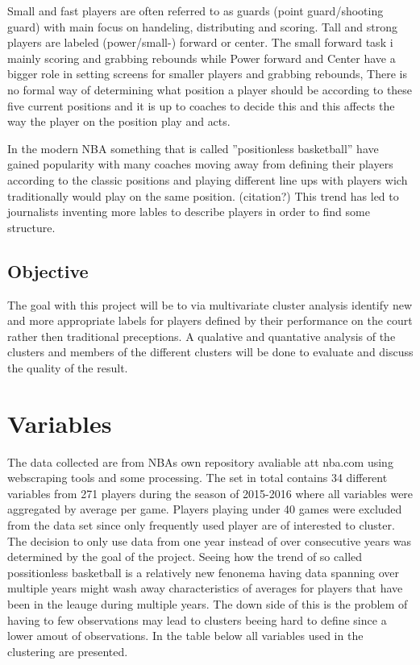 \documentclass{article}
\begin{document}
Small and fast players are often referred to as guards (point guard/shooting guard) with main focus on handeling, distributing and scoring. Tall and strong players are labeled (power/small-) forward or center. The small forward task i mainly scoring and grabbing rebounds while Power forward and Center have a bigger role in setting screens for smaller players and grabbing rebounds,   There is no formal way of determining what position a player should be according to these five current positions and it is up to coaches to decide this and this affects the way the player on the position play and acts. 

In the modern NBA something that is called ”positionless basketball” have gained popularity with many coaches moving away from defining their players according to the classic positions and playing different line ups with players wich traditionally would play on the same position. (citation?) This trend has led to journalists inventing more lables to describe players in order to find some structure. 

\subsection{Objective}

The goal with this project will be to via multivariate cluster analysis identify new and  more appropriate labels for players defined by their performance on the court rather then traditional preceptions. A qualative and quantative analysis of the clusters and members of the different clusters will be done to evaluate and discuss the quality of the result.  



\section{Variables}

The data collected are from NBAs own repository avaliable att nba.com using webscraping tools and some processing. The set in total contains 34 different variables from 271 players during the season of 2015-2016 where all variables were aggregated by average per game. Players playing under 40 games were excluded from the data set since only frequently used player are of interested to cluster.  The decision to only use data from one year instead of over consecutive years was determined by the goal of the project. Seeing how the trend of so called possitionless basketball is a relatively new fenonema having data spanning over multiple years might wash away characteristics of averages for players that have been in the leauge during multiple years. The down side of this is the problem of having to few observations may lead to clusters beeing hard to define since a lower amout of observations. In the table below all variables used in the clustering are presented. 
\end{document}
